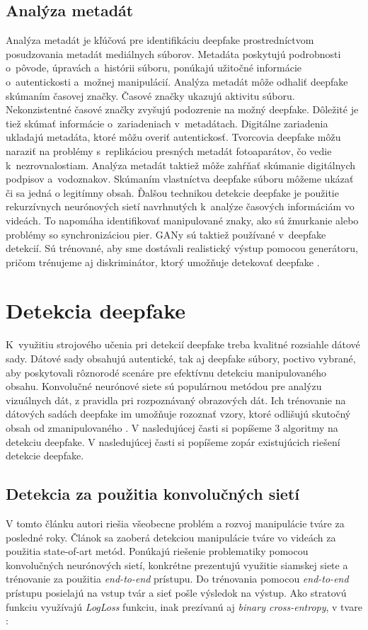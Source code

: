 \subsection{Analýza metadát}
Analýza metadát je kľúčová pre identifikáciu deepfake prostredníctvom posudzovania metadát mediálnych súborov. Metadáta poskytujú podrobnosti o~pôvode, úpravách a~histórii súboru, ponúkajú užitočné informácie o~autentickosti a~možnej manipulácií. Analýza metadát môže odhaliť deepfake skúmaním časovej značky. Časové značky ukazujú aktivitu súboru. Nekonzistentné časové značky zvyšujú podozrenie na možný deepfake. Dôležité je tiež skúmať informácie o~zariadeniach v~metadátach. Digitálne zariadenia ukladajú metadáta, ktoré môžu overiť autentickosť. Tvorcovia deepfake môžu naraziť na problémy s~replikáciou presných metadát fotoaparátov, čo vedie k~nezrovnalostiam. Analýza metadát taktiež môže zahŕňať skúmanie digitálnych podpisov a~vodoznakov. Skúmaním vlastníctva deepfake súboru môžeme ukázať či sa jedná o legitímny obsah. Ďalšou technikou detekcie deepfake je použitie rekurzívnych neurónových sietí navrhnutých k~analýze časových informáciám vo videách. To napomáha identifikovať manipulované znaky, ako sú žmurkanie alebo problémy so synchronizáciou pier. GANy sú taktiež používané v~deepfake detekcií. Sú trénované, aby sme dostávali realistický výstup pomocou generátoru, pričom trénujeme aj diskriminátor, ktorý umožňuje detekovať deepfake \cite{Deepdetect}. 

\section{Detekcia deepfake}
K~využitiu strojového učenia pri detekcií deepfake treba kvalitné rozsiahle dátové sady. Dátové sady obsahujú autentické, tak aj deepfake súbory, poctivo vybrané, aby poskytovali rôznorodé scenáre pre efektívnu detekciu manipulovaného obsahu. Konvolučné neurónové siete sú populárnou metódou pre analýzu vizuálnych dát, z pravidla pri rozpoznávaný obrazových dát. Ich trénovanie na dátových sadách deepfake im umožňuje rozoznať vzory, ktoré odlišujú skutočný obsah od zmanipulovaného \cite{Deepdetect}. V nasledujúcej časti si popíšeme 3 algoritmy na detekciu deepfake. V nasledujúcej časti si popíšeme zopár existujúcich riešení detekcie deepfake.

\subsection{Detekcia za použitia konvolučných sietí}
V tomto článku autori riešia všeobecne problém a rozvoj manipulácie tváre za posledné roky. Článok sa zaoberá detekciou manipulácie tváre vo videách za použitia state-of-art metód. Ponúkajú riešenie problematiky pomocou konvolučných neurónových sietí, konkrétne prezentujú využitie siamskej siete a trénovanie za použitia \textit{end-to-end} prístupu. Do trénovania pomocou \textit{end-to-end} prístupu posielajú na vstup tvár a sieť pošle výsledok na výstup. Ako stratovú funkciu využívajú \textit{LogLoss} funkciu, inak prezívanú aj \textit{binary cross-entropy}, v tvare \cite{cnn_detekcia1}:

